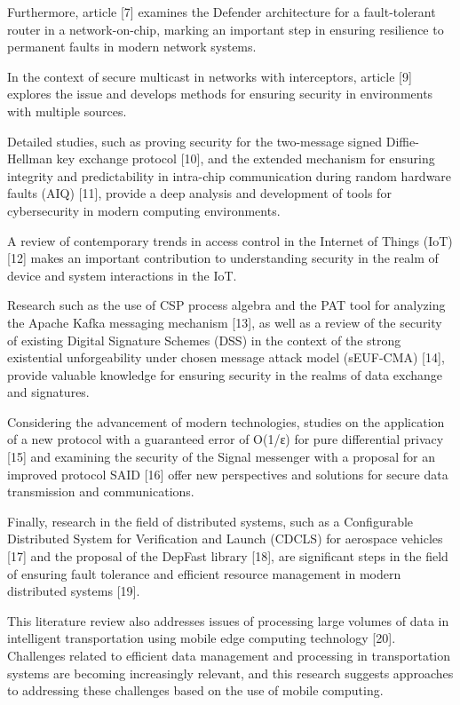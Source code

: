Furthermore, article {[}7{]} examines the Defender architecture for a
fault-tolerant router in a network-on-chip, marking an important step in
ensuring resilience to permanent faults in modern network systems.

In the context of secure multicast in networks with interceptors,
article {[}9{]} explores the issue and develops methods for ensuring
security in environments with multiple sources.

Detailed studies, such as proving security for the two-message signed
Diffie-Hellman key exchange protocol {[}10{]}, and the extended
mechanism for ensuring integrity and predictability in intra-chip
communication during random hardware faults (AIQ) {[}11{]}, provide a
deep analysis and development of tools for cybersecurity in modern
computing environments.

A review of contemporary trends in access control in the Internet of
Things (IoT) {[}12{]} makes an important contribution to understanding
security in the realm of device and system interactions in the IoT.

Research such as the use of CSP process algebra and the PAT tool for
analyzing the Apache Kafka messaging mechanism {[}13{]}, as well as a
review of the security of existing Digital Signature Schemes (DSS) in
the context of the strong existential unforgeability under chosen
message attack model (sEUF-CMA) {[}14{]}, provide valuable knowledge for
ensuring security in the realms of data exchange and signatures.

Considering the advancement of modern technologies, studies on the
application of a new protocol with a guaranteed error of O(1/ε) for pure
differential privacy {[}15{]} and examining the security of the Signal
messenger with a proposal for an improved protocol SAID {[}16{]} offer
new perspectives and solutions for secure data transmission and
communications.

Finally, research in the field of distributed systems, such as a
Configurable Distributed System for Verification and Launch (CDCLS) for
aerospace vehicles {[}17{]} and the proposal of the DepFast library
{[}18{]}, are significant steps in the field of ensuring fault tolerance
and efficient resource management in modern distributed systems
{[}19{]}.

This literature review also addresses issues of processing large volumes
of data in intelligent transportation using mobile edge computing
technology {[}20{]}. Challenges related to efficient data management and
processing in transportation systems are becoming increasingly relevant,
and this research suggests approaches to addressing these challenges
based on the use of mobile computing.


